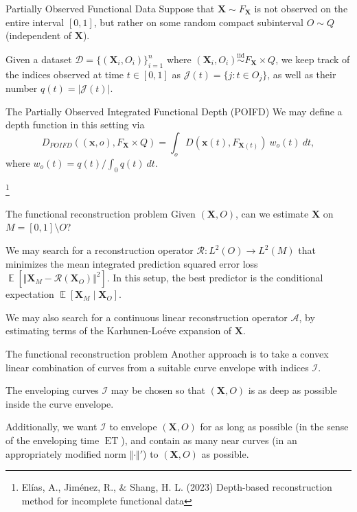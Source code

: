 \documentclass[handout, notes]{beamer}
\newcommand{\vx}{\bm{x}}
\newcommand{\vX}{\bm{X}}
\newcommand{\iid}{\overset{\text{iid}}{\sim}}
\DeclareMathOperator{\E}{\mathbb{E}}
\DeclareMathOperator{\ET}{ET}
\newcommand{\norm}[1]{\Vert #1 \Vert}
\newcommand\blfootnote[1]{%
  \begingroup
  \renewcommand\thefootnote{}\footnote{#1}%
  \addtocounter{footnote}{-1}%
  \endgroup
}
\begin{document}
    \begin{frame}{Partially Observed Functional Data}
        Suppose that $\vX \sim F_{\vX}$ is not observed on the entire interval
        $[0, 1]$, but rather on some random compact subinterval $O \sim Q$
        (independent of $\vX$).

        Given a dataset $\mathscr{D} = \{(\vX_i, O_i)\}_{i = 1}^n$ where
        $(\vX_i, O_i) \iid F_{\vX} \times Q$, we keep track of the indices
        observed at time $t \in [0, 1]$ as $\mathscr{J}(t) = \{j\colon t \in
        O_j\}$, as well as their number $q(t) = |\mathscr{J}(t)|$.
    \end{frame}

    \begin{frame}{The Partially Observed Integrated Functional Depth (POIFD)}
        We may define a depth function in this setting via \[
            D_{POIFD}((\vx, o), F_{\vX} \times Q) = \int_{o} D(\vx(t), F_{\vX(t)}) \:w_o(t)\:dt,
        \] where $w_o(t) = q(t) / \int_0 q(t)\:dt$.

        \blfootnote{
            El\'ias, A., Jim\'enez, R., \& Shang, H. L. (2023) Depth-based
            reconstruction method for incomplete functional data
        }
    \end{frame}


    \begin{frame}{The functional reconstruction problem}
        Given $(\vX, O)$, can we estimate $\vX$ on $M = [0, 1]\setminus O$?

        We may search for a reconstruction operator $\mathcal{R}\colon L^2(O)
        \to L^2(M)$ that minimizes the mean integrated prediction squared
        error loss $\E[\norm{\vX_M - \mathcal{R}(\vX_O)}^2]$.
        In this setup, the best predictor is the conditional expectation
        $\E[\vX_M \mid \vX_O]$.

        We may also search for a continuous linear reconstruction operator
        $\mathscr{A}$, by estimating terms of the Karhunen-Lo\'eve expansion
        of $\vX$.
    \end{frame}


    \begin{frame}{The functional reconstruction problem}
        Another approach is to take a convex linear combination of curves from
        a suitable curve envelope with indices $\mathscr{I}$.

        The enveloping curves $\mathscr{I}$ may be chosen so that $(\vX, O)$
        is as deep as possible inside the curve envelope.

        Additionally, we want $\mathscr{I}$ to envelope $(\vX, O)$ for as long
        as possible (in the sense of the enveloping time $\ET$), and contain
        as many near curves (in an appropriately modified norm
        $\norm{\cdot}'$) to $(\vX, O)$ as possible.
    \end{frame}
\end{document}
